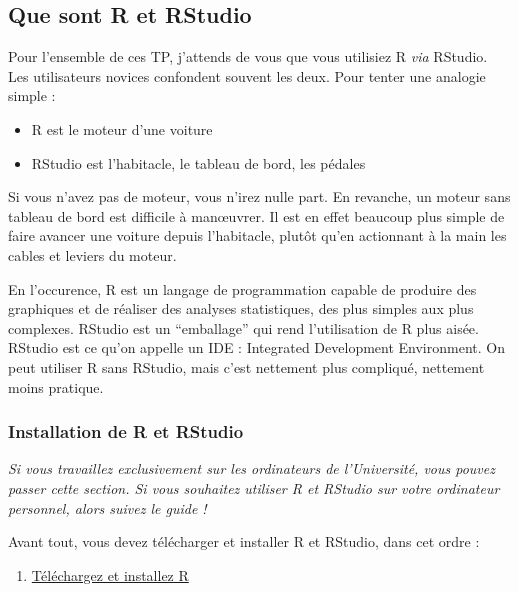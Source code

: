 \documentclass[a4paperpaper,]{article}
\providecommand{\tightlist}{%
  \setlength{\itemsep}{0pt}\setlength{\parskip}{0pt}}
\begin{document}
\hypertarget{que-sont-r-et-rstudio}{%
\subsection{Que sont R et RStudio}\label{que-sont-r-et-rstudio}}

Pour l'ensemble de ces TP, j'attends de vous que vous utilisiez R \emph{via} RStudio. Les utilisateurs novices confondent souvent les deux. Pour tenter une analogie simple :

\begin{itemize}
\tightlist
\item
  R est le moteur d'une voiture
\item
  RStudio est l'habitacle, le tableau de bord, les pédales
\end{itemize}

Si vous n'avez pas de moteur, vous n'irez nulle part. En revanche, un moteur sans tableau de bord est difficile à manœuvrer. Il est en effet beaucoup plus simple de faire avancer une voiture depuis l'habitacle, plutôt qu'en actionnant à la main les cables et leviers du moteur.

En l'occurence, R est un langage de programmation capable de produire des graphiques et de réaliser des analyses statistiques, des plus simples aux plus complexes. RStudio est un ``emballage'' qui rend l'utilisation de R plus aisée. RStudio est ce qu'on appelle un IDE : Integrated Development Environment. On peut utiliser R sans RStudio, mais c'est nettement plus compliqué, nettement moins pratique.

\hypertarget{installation-de-r-et-rstudio}{%
\subsubsection{Installation de R et RStudio}\label{installation-de-r-et-rstudio}}

\emph{Si vous travaillez exclusivement sur les ordinateurs de l'Université, vous pouvez passer cette section. Si vous souhaitez utiliser R et RStudio sur votre ordinateur personnel, alors suivez le guide !}

Avant tout, vous devez télécharger et installer R et RStudio, dans cet ordre :

\begin{enumerate}
\def\labelenumi{\arabic{enumi}.}
\tightlist
\item
  \href{https://cran.r-project.org}{Téléchargez et installez R}
\end{enumerate}
\end{document}
